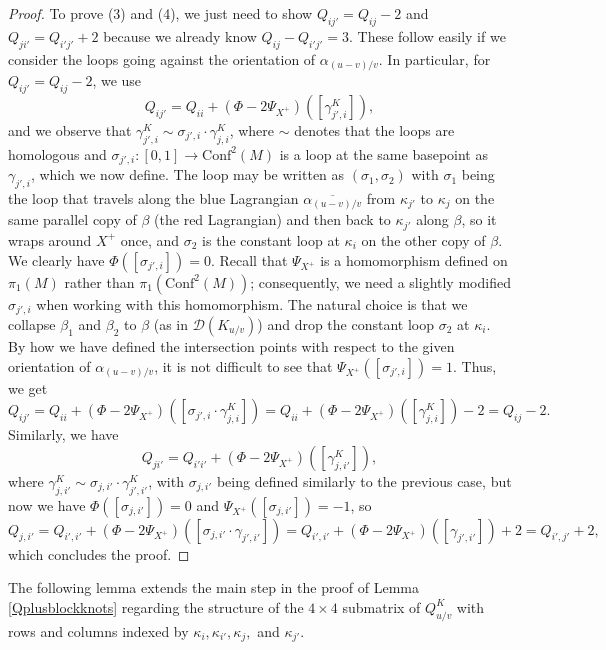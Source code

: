 \documentclass[11pt]{amsart}
\theoremstyle{plain}
\theoremstyle{definition}
\theoremstyle{remark}
\begin{document}
\begin{proof}
To prove (3) and (4), we just need to show $Q_{ij'}=Q_{ij}-2$ and $Q_{ji'}=Q_{i'j'}+2$ because we already know $Q_{ij}-Q_{i'j'}=3$. These follow easily if we consider the loops going against the orientation of $\alpha_{(u-v)/v}$. In particular, for $Q_{ij'}=Q_{ij}-2$, we use
\[
Q_{ij'}=Q_{ii}+(\Phi-2\Psi_{X^+})([\gamma_{j',i}^K]),
\]
and we observe that $\gamma_{j',i}^K\sim \sigma_{j',i}\cdot \gamma_{j,i}^K$, where $\sim$ denotes that the loops are homologous and $\sigma_{j',i}:[0,1]\to \text{Conf}^2(M)$ is a loop at the same basepoint as $\gamma_{j',i}$, which we now define. The loop may be written as $(\sigma_1,\sigma_2)$ with $\sigma_1$ being the loop that travels along the blue Lagrangian $\overline{\alpha_{(u-v)/v}}$ from $\kappa_{j'}$ to $\kappa_j$ on the same parallel copy of $\beta$ (the red Lagrangian) and then back to $\kappa_{j'}$ along $\beta$, so it wraps around $X^+$ once, and $\sigma_2$ is the constant loop at $\kappa_i$ on the other copy of $\beta$. We clearly have $\Phi([\sigma_{j',i}])=0$. Recall that $\Psi_{X^+}$ is a homomorphism defined on $\pi_1(M)$ rather than $\pi_1(\text{Conf}^2(M))$; consequently, we need a slightly modified $\sigma_{j',i}$ when working with this homomorphism. The natural choice is that we collapse $\beta_1$ and $\beta_2$ to $\beta$ (as in $\mathcal{D}(K_{u/v})$) and drop the constant loop $\sigma_2$ at $\kappa_i$. By how we have defined the intersection points with respect to the given orientation of $\alpha_{(u-v)/v}$, it is not difficult to see that $\Psi_{X^+}([\sigma_{j',i}])=1$. Thus, we get
\[
Q_{ij'}=Q_{ii}+(\Phi-2\Psi_{X^+})([\sigma_{j',i}\cdot \gamma_{j,i}^K])= Q_{ii}+(\Phi-2\Psi_{X^+})([ \gamma_{j,i}^K])-2=Q_{ij}-2.
\]
Similarly, we have 
\[
Q_{ji'}=Q_{i'i'}+(\Phi-2\Psi_{X^+})([\gamma_{j,i'}^K]),
\]
where $\gamma_{j,i'}^K \sim \sigma_{j,i'}\cdot \gamma_{j',i'}^K$, with $\sigma_{j,i'}$ being defined similarly to the previous case, but now we have $\Phi([\sigma_{j,i'}])=0$ and $\Psi_{X^+}([\sigma_{j,i'}])=-1$, so
\[
Q_{j,i'}=Q_{i',i'}+(\Phi-2\Psi_{X^+})([\sigma_{j,i'}\cdot \gamma_{j',i'}])= Q_{i',i'}+(\Phi-2\Psi_{X^+})([ \gamma_{j',i'}])+2=Q_{i',j'}+2,
\]
which concludes the proof.
\end{proof}

The following lemma extends the main step in the proof of Lemma \ref{Qplusblockknots} regarding the structure of the $4\times 4$ submatrix of $Q_{u/v}^K$ with rows and columns indexed by $\kappa_i, \kappa_{i'}, \kappa_j,$ and $\kappa_{j'}$.
\end{document}
